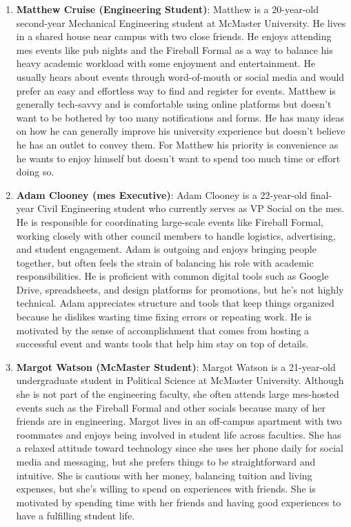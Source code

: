 \documentclass[12pt]{article}
\begin{document}
\begin{enumerate}
  \item \textbf{Matthew Cruise (Engineering Student)}: Matthew is a 20-year-old second-year Mechanical Engineering
    student at McMaster University. He lives in a shared house near campus with two close friends. He enjoys attending
    \gls{mes} events like pub nights and the Fireball Formal as a way to balance his heavy academic workload with some
    enjoyment and entertainment. He usually hears about events through word-of-mouth or social media and would prefer an
    easy and effortless way to find and register for events. Matthew is generally tech-savvy and is comfortable using
    online platforms but doesn't want to be bothered by too many notifications and forms. He has many ideas on how he
    can generally improve his university experience but doesn't believe he has an outlet to convey them. For Matthew his
    priority is convenience as he wants to enjoy himself but doesn't want to spend too much time or effort doing so.
  \item \textbf{Adam Clooney (\gls{mes} Executive)}: Adam Clooney is a 22-year-old final-year Civil Engineering student
    who currently serves as VP Social on the \gls{mes}. He is responsible for coordinating large-scale events like
    Fireball Formal, working closely with other council members to handle logistics, advertising, and student
    engagement. Adam is outgoing and enjoys bringing people together, but often feels the strain of balancing his role
    with academic responsibilities. He is proficient with common digital tools such as Google Drive, spreadsheets, and
    design platforms for promotions, but he’s not highly technical. Adam appreciates structure and tools that keep
    things organized because he dislikes wasting time fixing errors or repeating work. He is motivated by the sense of
    accomplishment that comes from hosting a successful event and wants tools that help him stay on top of details.
  \item \textbf{Margot Watson (McMaster Student)}: Margot Watson is a 21-year-old undergraduate student in Political
    Science at McMaster University. Although she is not part of the engineering faculty, she often attends large
    \gls{mes}-hosted events such as the Fireball Formal and other socials because many of her friends are in
    engineering. Margot lives in an off-campus apartment with two roommates and enjoys being involved in student life
    across faculties. She has a relaxed attitude toward technology since she uses her phone daily for social media and
    messaging, but she prefers things to be straightforward and intuitive. She is cautious with her money, balancing
    tuition and living expenses, but she’s willing to spend on experiences with friends. She is motivated by spending
    time with her friends and having good experiences to have a fulfilling student life.
\end{enumerate}
\end{document}
